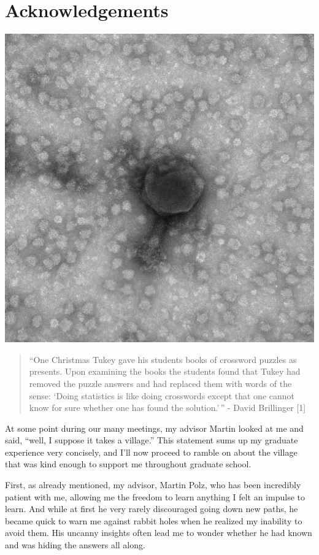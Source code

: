 \documentclass[12pt,twoside]{mitthesis-manusdown}
\begin{document}
  \listoffigures


\raggedbottom

\chapter*{Acknowledgements}\label{acknowledgements}
\begin{center}\includegraphics[width=0.85\linewidth]{figuresintro/emonephage} \end{center}
\begin{quote}
``One Christmas Tukey gave his students books of crossword puzzles as
presents. Upon examining the books the students found that Tukey had
removed the puzzle answers and had replaced them with words of the
sense: `Doing statistics is like doing crosswords except that one cannot
know for sure whether one has found the solution.'\,'' - David
Brillinger {[}1{]}
\end{quote}
At some point during our many meetings, my advisor Martin looked at me
and said, ``well, I suppose it takes a village.'' This statement sums up
my graduate experience very concisely, and I'll now proceed to ramble on
about the village that was kind enough to support me throughout graduate
school.

First, as already mentioned, my advisor, Martin Polz, who has been
incredibly patient with me, allowing me the freedom to learn anything I
felt an impulse to learn. And while at first he very rarely discouraged
going down new paths, he became quick to warn me against rabbit holes
when he realized my inability to avoid them. His uncanny insights often
lead me to wonder whether he had known and was hiding the answers all
along.
\end{document}
